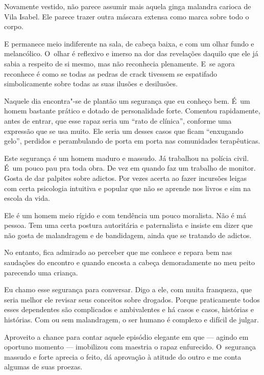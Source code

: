 Novamente vestido,  não parece assumir mais aquela ginga malandra
carioca de Vila Isabel. Ele parece trazer outra máscara extensa como
marca sobre todo o corpo.

E permanece meio indiferente na sala, de cabeça baixa, e com um olhar
fundo e melancólico. O~olhar é reflexivo e imerso na dor das revelações
daquilo que ele já sabia a respeito de si mesmo, mas não reconhecia
plenamente. E~se agora reconhece é como se todas as pedras de crack
tivessem se espatifado simbolicamente sobre todas as suas ilusões e
desilusões.

\asterisc{}

Naquele dia encontra"-se de plantão um segurança que eu conheço bem. É~um
homem bastante prático e dotado de personalidade forte. Comentou
rapidamente, antes de  entrar, que esse rapaz seria um ``rato de
clínica'', conforme uma expressão que se usa muito. Ele seria um desses
casos que ficam ``enxugando gelo'', perdidos e perambulando de porta em
porta nas comunidades terapêuticas.

Este segurança é um homem maduro e massudo. Já trabalhou na polícia
civil. É~um pouco pau pra toda obra. De vez em quando faz um trabalho de
monitor. Gosta de dar palpites sobre adictos. Por vezes acerta ao fazer
incursões leigas com certa psicologia intuitiva e popular que não se
aprende nos livros e sim na escola da vida.

Ele é um homem meio rígido e com tendência um pouco moralista. Não é má
pessoa. Tem uma certa postura autoritária e paternalista e insiste em
dizer que não gosta de malandragem e de bandidagem, ainda que se
tratando de adictos.

No entanto, fica admirado ao perceber que  me conhece e repara bem nas
saudações do encontro e quando  encosta a cabeça demoradamente no meu
peito parecendo uma criança.

Eu chamo esse segurança para conversar. Digo a ele, com muita franqueza,
que seria melhor ele revisar seus conceitos sobre drogados. Porque
praticamente todos esses dependentes são complicados e ambivalentes e há
casos e casos, histórias e histórias. Com ou sem malandragem, o ser humano
é complexo e difícil de julgar.

Aproveito a chance para contar aquele episódio elegante em que  ---
agindo em oportuno momento --- imobilizou com maestria o rapaz
enfurecido. O~segurança massudo e forte aprecia o feito, dá aprovação à
atitude do outro e me conta algumas de suas proezas.

